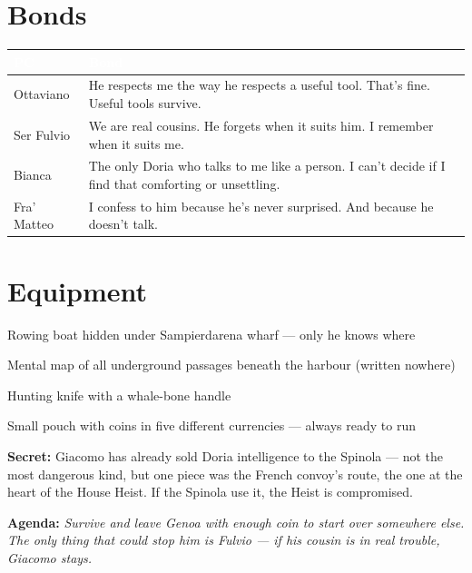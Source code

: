 \section*{Bonds}
\begin{table}[h]
\centering\renewcommand{\arraystretch}{1.4}
\begin{tabularx}{\linewidth}{@{}L{2.4cm} X@{}}
  \toprule{}
  \textcolor{white}{\textbf{PC}} & \textcolor{white}{\textbf{Bond}} \\
  \midrule
  Ottaviano & He respects me the way he respects a useful tool. That's fine. Useful tools survive. \\
  Ser Fulvio & We are real cousins. He forgets when it suits him. I remember when it suits me. \\
  Bianca & The only Doria who talks to me like a person. I can't decide if I find that comforting or unsettling. \\
  Fra' Matteo & I confess to him because he's never surprised. And because he doesn't talk. \\
  \bottomrule
\end{tabularx}
\end{table}

\section*{Equipment}
\begin{goldlist}
  \item Rowing boat hidden under Sampierdarena wharf --- only he knows where
  \item Mental map of all underground passages beneath the harbour (written nowhere)
  \item Hunting knife with a whale-bone handle
  \item Small pouch with coins in five different currencies --- always ready to run
\end{goldlist}

\clearpage

\begin{secretbox}
  \textbf{Secret:} Giacomo has already sold Doria intelligence to the Spinola --- not
  the most dangerous kind, but one piece was the French convoy's route, the one at
  the heart of the House Heist. If the Spinola use it, the Heist is compromised.

  \medskip\noindent\textcolor{SecretRed}{\textbf{Agenda:}}
  \textit{Survive and leave Genoa with enough coin to start over somewhere else.
  The only thing that could stop him is Fulvio --- if his cousin is in real
  trouble, Giacomo stays.}
\end{secretbox}
